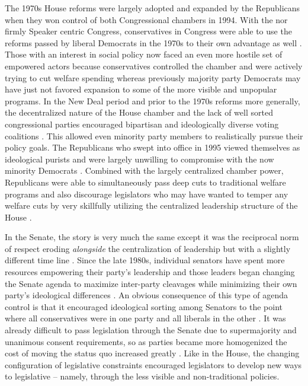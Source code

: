 \documentclass[12pt]{article}
\begin{document}
The 1970s House reforms were largely adopted and expanded by the Republicans when they won control of both Congressional chambers in 1994. With the nor firmly Speaker centric Congress, conservatives in Congress were able to use the reforms passed by liberal Democrats in the 1970s to their own advantage as well \citep{zelizer2007}. Those with an interest in social policy now faced an even more hostile set of empowered actors because conservatives controlled the chamber and were actively trying to cut welfare spending whereas previously majority party Democrats may have just not favored expansion to some of the more visible and unpopular programs. In the New Deal period and prior to the 1970s reforms more generally, the decentralized nature of the House chamber and the lack of well sorted congressional parties encouraged bipartisan and ideologically diverse voting coalitions \citep{poole1997}. This allowed even minority party members to realistically pursue their policy goals. The Republicans who swept into office in 1995 viewed themselves as ideological purists and were largely unwilling to compromise with the now minority Democrats \citep{hacker2006, theriault2013}. Combined with the largely centralized chamber power, Republicans were able to simultaneously pass deep cuts to traditional welfare programs and also discourage legislators who may have wanted to temper any welfare cuts by very skillfully utilizing the centralized leadership structure of the House \citep{aldrich2000}. 

In the Senate, the story is very much the same except it was the reciprocal norm of respect eroding \emph{alongside} the centralization of leadership but with a slightly different time line \citep{sinclair1986}. Since the late 1980s, individual senators have spent more resources empowering their party's leadership and those leaders began changing the Senate agenda to maximize inter-party cleavages while minimizing their own party's ideological differences \citep{lee2008}. An obvious consequence of this type of agenda control is that it encouraged ideological sorting among Senators to the point where all conservatives were in one party and all liberals in the other \citep{poole1997}. It was already difficult to pass legislation through the Senate due to supermajority and unanimous consent requirements, so as parties became more homogenized the cost of moving the status quo increased greatly \citep{koger2010}. Like in the House, the changing configuration of legislative constraints encouraged legislators to develop new ways to legislative -- namely, through the less visible and non-traditional policies.
\end{document}
